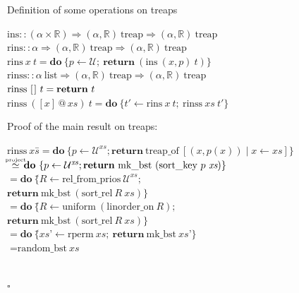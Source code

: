 \documentclass[%
	sans,
	12pt,
]{beamer}
\makeatletter
\newcommand{\listapp}{\mathbin{@}}
\newcommand{\listnil}{[\hskip0.3mm]}
\makeatother
\begin{document}
\begin{frame}{Definition of some operations on treaps}
\begin{tabbing}
$\text{ins} :: (\alpha \times \mathbb{R}) \Rightarrow (\alpha, \mathbb{R})\ \text{treap} \Rightarrow (\alpha, \mathbb{R})\ \text{treap}$\\[4mm]\pause
$\text{rins} :: \alpha \Rightarrow (\alpha, \mathbb{R})\ \text{treap} \Rightarrow (\alpha, \mathbb{R})\ \text{treap}$\\[0.5mm]
$\text{rins}\ x\ t = \textbf{do}\ \{p \leftarrow \mathcal U;\ \textbf{return}\ (\text{ins}\ (x, p)\ t)\}$\\[4mm]\pause
$\text{rinss} :: \alpha\ \text{list} \Rightarrow (\alpha, \mathbb{R})\ \text{treap} \Rightarrow (\alpha, \mathbb{R})\ \text{treap}$\\[0.5mm]
$\text{rinss}\ \listnil\ t = \textbf{return}\ t$\\
$\text{rinss}\ ([x]\listapp \textit{xs})\ t = \textbf{do}\ \{t' \leftarrow \text{rins}\ x\ t;\ \text{rinss}\ \textit{xs}\ t'\}$
\end{tabbing}
\end{frame}

\begin{frame}{Proof of the main result on treaps:}
\begin{center}
\parbox{0cm}{
\small
\begin{tabbing}
$\text{rinss}\ \textit{xs} $\=${}= \textbf{do}\ \{p \leftarrow \mathcal U^{\textit{xs}}; \textbf{return}\ \text{treap\_of}\ [(x, p(x))\mid x\leftarrow \textit{xs}]\}$\\[2mm]\pause
\>${}\hskip-1.8mm\stackrel{\text{\tiny project}}\simeq \hskip-1.8mm\textbf{do}\ \{p \leftarrow \mathcal U^{\textit{xs}}; \textbf{return}\ \text{mk\_bst}\ (\text{sort\_key}\ p\ \textit{xs})\}$\\[2mm]\pause
\>${}= \textbf{do}\ \{$\=$R \leftarrow \text{rel\_from\_prios}\ \mathcal U^{\textit{xs}};$\\\>\> $\textbf{return}\ \text{mk\_bst}\ (\text{sort\_rel}\ R\ \textit{xs})\}$\\[2mm]\pause
\>${}= \textbf{do}\ \{$\=$R \leftarrow \text{uniform}\ (\text{linorder\_on}\ R);$\\\>\> $\textbf{return}\ \text{mk\_bst}\ (\text{sort\_rel}\ R\ \textit{xs})\}$\\[2mm]\pause
\>${}= \textbf{do}\ \{$\=$\textit{xs'} \leftarrow \text{rperm}\ \textit{xs};\ \textbf{return}\ \text{mk\_bst}\ \textit{xs'}\}$\\[2mm]\pause
\>${}= \text{random\_bst}\ \textit{xs}$
\end{tabbing}}\\[-2em]\pause
\mbox{}\hspace*{\fill}$\square$\hspace*{1em}
\end{center}
\end{frame}
\end{document}
